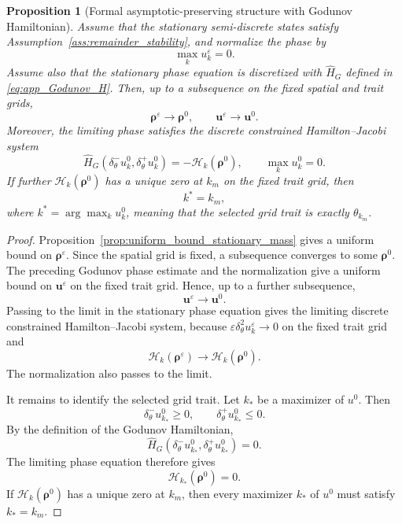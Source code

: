 \documentclass[11pt]{article}
\numberwithin{equation}{section}
\newtheorem{proposition}{Proposition}[section]
\begin{document}
\begin{proposition}[Formal asymptotic-preserving structure with Godunov Hamiltonian]
\label{prop:formal_asymptotic preserving_trait_selection}
Assume that the stationary semi-discrete states satisfy
Assumption~\ref{ass:remainder_stability}, and normalize the phase by
\[
    \max_k u_k^\varepsilon=0 .
\]
Assume also that the stationary phase equation is discretized with
\(\widehat H_G\) defined in \eqref{eq:app_Godunov_H}.  Then, up to a subsequence on
the fixed spatial and trait grids,
\[
    \boldsymbol\rho^\varepsilon\to \boldsymbol\rho^0,
    \qquad
    \boldsymbol u^\varepsilon\to \boldsymbol u^0 .
\]
Moreover, the limiting phase satisfies the discrete constrained
Hamilton--Jacobi system
\[
    \widehat H_G
    \left(
        \delta_\theta^-u_k^0,
        \delta_\theta^+u_k^0
    \right)
    =
    -\mathcal H_k(\boldsymbol\rho^0),
    \qquad
    \max_k u_k^0=0 .
\]
If further \(\mathcal H_k(\boldsymbol\rho^0)\) has a unique zero at
\(k_m\) on the fixed trait grid, then
\[
    k^*  = k_m,
\]
where $ k^* = \arg\max_k u_k^0$, meaning that the selected grid trait is exactly \(\theta_{k_m}\).
\end{proposition}

\begin{proof}
Proposition~\ref{prop:uniform_bound_stationary_mass} gives a uniform bound on
\(\boldsymbol\rho^\varepsilon\).  Since the spatial grid is fixed, a subsequence
converges to some \(\boldsymbol\rho^0\).  The preceding Godunov phase estimate
and the normalization give a uniform bound on \(\boldsymbol u^\varepsilon\) on
the fixed trait grid.  Hence, up to a further subsequence,
\[
    \boldsymbol u^\varepsilon\to \boldsymbol u^0 .
\]
Passing to the limit in the stationary phase equation gives the limiting
discrete constrained Hamilton--Jacobi system, because
\(\varepsilon\delta_\theta^2u_k^\varepsilon\to0\) on the fixed trait grid and
\[
    \mathcal H_k(\boldsymbol\rho^\varepsilon)
    \to
    \mathcal H_k(\boldsymbol\rho^0).
\]
The normalization also passes to the limit.

It remains to identify the selected grid trait.  Let \(k_*\) be a maximizer of
\(u^0\).  Then
\[
    \delta_\theta^-u_{k_*}^0\ge0,
    \qquad
    \delta_\theta^+u_{k_*}^0\le0 .
\]
By the definition of the Godunov Hamiltonian,
\[
    \widehat H_G
    \left(
        \delta_\theta^-u_{k_*}^0,
        \delta_\theta^+u_{k_*}^0
    \right)
    =
    0 .
\]
The limiting phase equation therefore gives
\[
    \mathcal H_{k_*}(\boldsymbol\rho^0)=0 .
\]
If \(\mathcal H_k(\boldsymbol\rho^0)\) has a unique zero at \(k_m\), then every
maximizer \(k_*\) of \(u^0\) must satisfy \(k_*=k_m\). 
\end{proof}
\end{document}
